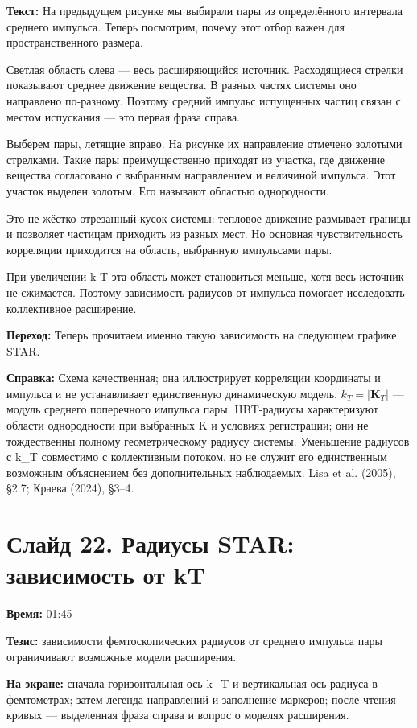 \documentclass[11pt,a4paper]{article}
\begin{document}
\textbf{Текст:} На предыдущем рисунке мы выбирали пары из определённого интервала среднего импульса. Теперь посмотрим, почему этот отбор важен для пространственного размера.

Светлая область слева — весь расширяющийся источник. Расходящиеся стрелки показывают среднее движение вещества. В разных частях системы оно направлено по-разному. Поэтому средний импульс испущенных частиц связан с местом испускания — это первая фраза справа.

Выберем пары, летящие вправо. На рисунке их направление отмечено золотыми стрелками. Такие пары преимущественно приходят из участка, где движение вещества согласовано с выбранным направлением и величиной импульса. Этот участок выделен золотым. Его называют областью однородности.

Это не жёстко отрезанный кусок системы: тепловое движение размывает границы и позволяет частицам приходить из разных мест. Но основная чувствительность корреляции приходится на область, выбранную импульсами пары.

При увеличении k-T эта область может становиться меньше, хотя весь источник не сжимается. Поэтому зависимость радиусов от импульса помогает исследовать коллективное расширение.

\textbf{Переход:} Теперь прочитаем именно такую зависимость на следующем графике STAR.

\textbf{Справка:} Схема качественная; она иллюстрирует корреляции координаты и импульса и не устанавливает единственную динамическую модель. \(k_T=|\mathbf K_T|\) — модуль среднего поперечного импульса пары. HBT-радиусы характеризуют области однородности при выбранных K и условиях регистрации; они не тождественны полному геометрическому радиусу системы. Уменьшение радиусов с k\_T совместимо с коллективным потоком, но не служит его единственным возможным объяснением без дополнительных наблюдаемых. Lisa et al. (2005), §2.7; Краева (2024), §3–4.

\clearpage
\section*{Слайд 22. Радиусы STAR: зависимость от kT}
\textbf{Время:} 01:45

\textbf{Тезис:} зависимости фемтоскопических радиусов от среднего импульса пары ограничивают возможные модели расширения.

\textbf{На экране:} сначала горизонтальная ось k\_T и вертикальная ось радиуса в фемтометрах; затем легенда направлений и заполнение маркеров; после чтения кривых — выделенная фраза справа и вопрос о моделях расширения.
\end{document}
